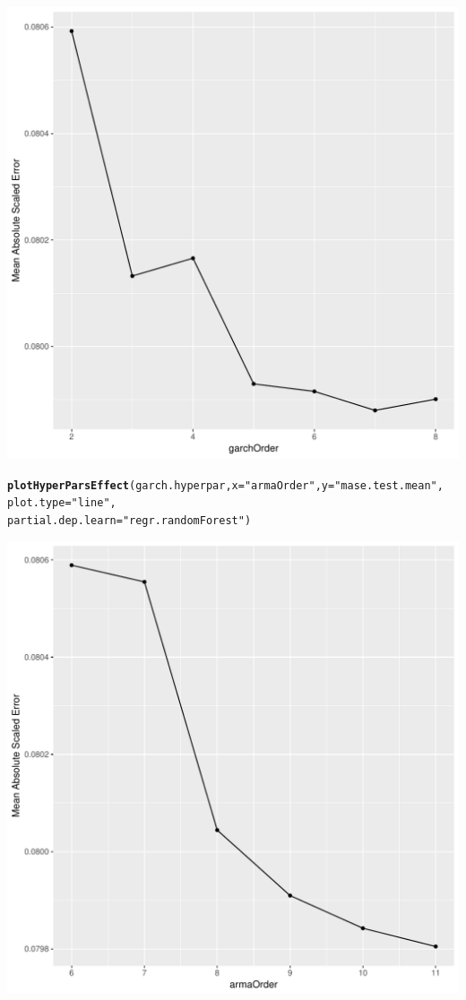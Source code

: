 \documentclass[12pt]{article}\usepackage[]{graphicx}\usepackage[]{color}
\makeatletter
\def\maxwidth{ %
  \ifdim\Gin@nat@width>\linewidth
    \linewidth
  \else
    \Gin@nat@width
  \fi
}
\newcommand{\hlstr}[1]{\textcolor[rgb]{0.192,0.494,0.8}{#1}}%
\newcommand{\hlstd}[1]{\textcolor[rgb]{0.345,0.345,0.345}{#1}}%
\newcommand{\hlkwc}[1]{\textcolor[rgb]{0.333,0.667,0.333}{#1}}%
\newcommand{\hlkwd}[1]{\textcolor[rgb]{0.737,0.353,0.396}{\textbf{#1}}}%
\newenvironment{kframe}{%
 \def\at@end@of@kframe{}%
 \ifinner\ifhmode%
  \def\at@end@of@kframe{\end{minipage}}%
  \begin{minipage}{\columnwidth}%
 \fi\fi%
 \def\FrameCommand##1{\hskip\@totalleftmargin \hskip-\fboxsep
 \colorbox{shadecolor}{##1}\hskip-\fboxsep
     \hskip-\linewidth \hskip-\@totalleftmargin \hskip\columnwidth}%
 \MakeFramed {\advance\hsize-\width
   \@totalleftmargin\z@ \linewidth\hsize
   \@setminipage}}%
 {\par\unskip\endMakeFramed%
 \at@end@of@kframe}
\newenvironment{knitrout}{}{} %
\theoremstyle{definition}
\makeatother
\begin{document}
\begin{knitrout}
\includegraphics[width=\maxwidth]{figure/makeHyperPlot-1} 
\begin{kframe}\begin{alltt}
\hlkwd{plotHyperParsEffect}\hlstd{(garch.hyperpar,} \hlkwc{x}\hlstd{=} \hlstr{"armaOrder"}\hlstd{,} \hlkwc{y} \hlstd{=} \hlstr{"mase.test.mean"}\hlstd{,}
                     \hlkwc{plot.type} \hlstd{=} \hlstr{"line"}\hlstd{,}
                     \hlkwc{partial.dep.learn} \hlstd{=} \hlstr{"regr.randomForest"}\hlstd{)}
\end{alltt}
\end{kframe}
\includegraphics[width=\maxwidth]{figure/makeHyperPlot-2} 

\end{knitrout}
\doublespacing
\end{document}
